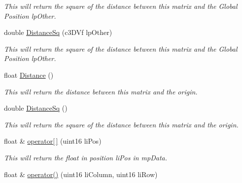 \begin{DoxyCompactItemize}
\begin{DoxyCompactList}\small\item\em This will return the square of the distance between this matrix and the Global Position lpOther. \end{DoxyCompactList}\item 
\hypertarget{classc_matrix4_a9fcbadde64114136ecf9cccf75eb2838}{
double \hyperlink{classc_matrix4_a9fcbadde64114136ecf9cccf75eb2838}{DistanceSq} (c3DVf lpOther)}
\label{classc_matrix4_a9fcbadde64114136ecf9cccf75eb2838}

\begin{DoxyCompactList}\small\item\em This will return the square of the distance between this matrix and the Global Position lpOther. \end{DoxyCompactList}\item 
\hypertarget{classc_matrix4_ad6b0005cc0a13b2e186bc213ee842a51}{
float \hyperlink{classc_matrix4_ad6b0005cc0a13b2e186bc213ee842a51}{Distance} ()}
\label{classc_matrix4_ad6b0005cc0a13b2e186bc213ee842a51}

\begin{DoxyCompactList}\small\item\em This will return the distance between this matrix and the origin. \end{DoxyCompactList}\item 
\hypertarget{classc_matrix4_a11fc226f72e4dbd6a5428355def33ee5}{
double \hyperlink{classc_matrix4_a11fc226f72e4dbd6a5428355def33ee5}{DistanceSq} ()}
\label{classc_matrix4_a11fc226f72e4dbd6a5428355def33ee5}

\begin{DoxyCompactList}\small\item\em This will return the square of the distance between this matrix and the origin. \end{DoxyCompactList}\item 
\hypertarget{classc_matrix4_a4b91a4d790f5a0decc76d41e54b80049}{
float \& \hyperlink{classc_matrix4_a4b91a4d790f5a0decc76d41e54b80049}{operator\mbox{[}$\,$\mbox{]}} (uint16 liPos)}
\label{classc_matrix4_a4b91a4d790f5a0decc76d41e54b80049}

\begin{DoxyCompactList}\small\item\em This will return the float in position liPos in mpData. \end{DoxyCompactList}\item 
\hypertarget{classc_matrix4_a1e17bf69091f804aec716524dbdec375}{
float \& \hyperlink{classc_matrix4_a1e17bf69091f804aec716524dbdec375}{operator()} (uint16 liColumn, uint16 liRow)}
\label{classc_matrix4_a1e17bf69091f804aec716524dbdec375}


\end{DoxyCompactItemize}
